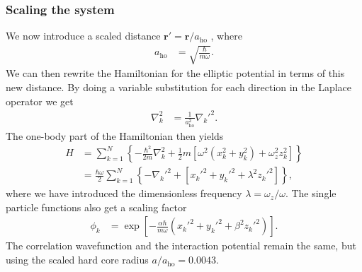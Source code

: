 \documentclass[
    a4paper, aps, twocolumn, floatfix, superscriptaddress,
    nofootinbib]{revtex4-1}
\newcommand{\vf}{\mathbf}
\newcommand{\1}{\mathds{1}}
\newcommand{\brak}[1]{\left[#1\right]}
\newcommand{\brac}[1]{\left\{#1\right\}}
\newcommand{\half}{\frac{1}{2}}
\begin{document}
        \subsubsection{Scaling the system}
            We now introduce a scaled distance $\vf{r}' = \vf{r}/a_{\text{ho}}$
            \cite{dubois2001bose}, where
            \begin{align}
                a_{\text{ho}}
                &=
                \sqrt{\frac{\hbar}{m\omega}}.
            \end{align}
            We can then rewrite the Hamiltonian for the elliptic potential in terms
            of this new distance. By doing a variable substitution for each
            direction in the Laplace operator we get
            \begin{align}
                \nabla_k^2
                &=
                \frac{1}{a_{\text{ho}}^2}{\nabla_k'}^2.
            \end{align}
            The one-body part of the Hamiltonian then yields
            \begin{align}
                H
                &=
                \sum_{k = 1}^N
                \brac{
                    -\frac{\hbar^2}{2m}\nabla_k^2
                    + \half m\brak{
                        \omega^2(x_k^2 + y_k^2)
                        + \omega_z^2 z_k^2
                    }
                }
                \\
                &=
                \frac{\hbar\omega}{2}
                \sum_{k = 1}^N
                \brac{
                    -{\nabla_k'}^2
                    +
                    \brak{
                        {x_k'}^2 + {y_k'}^2 + \lambda^2{z_k'}^2
                    }
                },
                \label{eq:scaled_hamiltonian}
            \end{align}
            where we have introduced the dimensionless frequency $\lambda =
            \omega_z/\omega$. The single particle functions also get a scaling
            factor
            \begin{align}
                \phi_k
                &=
                \exp\brak{
                    -\frac{\alpha\hbar}{m\omega}
                    ({x_k'}^2 + {y_k'}^2 + \beta^2{z_k'}^2)
                }.
                \label{eq:scaled_spf}
            \end{align}
            The correlation wavefunction and the interaction potential remain the
            same, but using the scaled hard core radius $a/a_{\text{ho}} =
            0.0043$.
\end{document}
